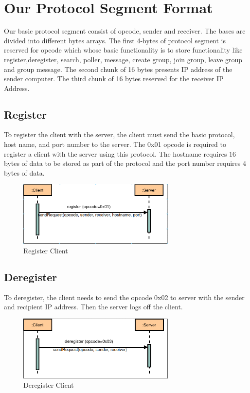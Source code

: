 \section{Our Protocol Segment Format}\label{sec:our protocol}
Our basic protocol segment consist of opcode, sender and receiver.
The bases are divided into different bytes arrays.
The first 4-bytes of protocol segment is reserved for opcode which whose basic functionality is
to store functionality like register,deregister, search, poller, message, create group, join group,
leave group and group message.
The second chunk of 16 bytes presents IP address of the sender computer.
The third chunk of 16 bytes reserved for the receiver IP Address.

\subsection{Register}\label{subsec:register}
To register the client with the server, the client must send the basic protocol, host name, and
port number to the server.
The 0x01 opcode is required to register a client with the server using this protocol.
The hostname requires 16 bytes of data to be stored as part of the protocol and the port number
requires 4 bytes of data.

\begin{figure}[htb!]
    \centering
    \includegraphics[width=0.7\textwidth]{gfx/protocoll_register}
    \caption{Register Client}
    \label{fig:register-client}
\end{figure}

\subsection{Deregister}\label{subsec:deregister}
To deregister, the client needs to send the opcode 0x02 to server with the sender and recipient
IP address.
Then the server logs off the client.

\begin{figure}[htb!]
    \centering
    \includegraphics[width=0.7\textwidth]{gfx/protocoll_deregister}
    \caption{Deregister Client}
    \label{fig:deregister-client}
\end{figure}

